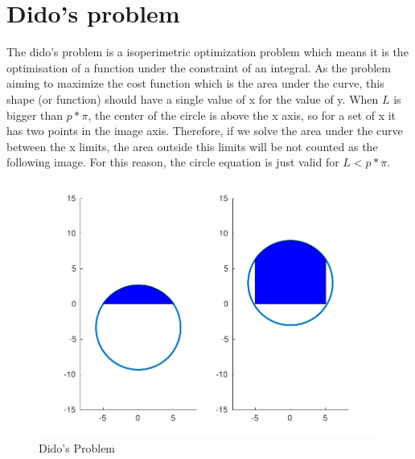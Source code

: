 \documentclass{article}
\begin{document}
\section{Dido's problem}

The dido's problem is a isoperimetric optimization problem which means it is the optimisation of a function under the constraint of an integral. As the problem aiming to maximize the cost function which is the area under the curve, this shape (or function) should have a single value of x for the value of y. When $L$ is bigger than $p*\pi$, the center of the circle is above the x axis, so for a set of x it has two points in the image axis. Therefore, if we solve the area under the curve between the x limits, the area outside this limits will be not counted as the following image. For this reason, the circle equation is just valid for $L < p*\pi$.

\begin{figure}[H]
\centering
\includegraphics [width=4.4in]{f3}
\caption{Dido's Problem}
\end{figure}
\end{document}
